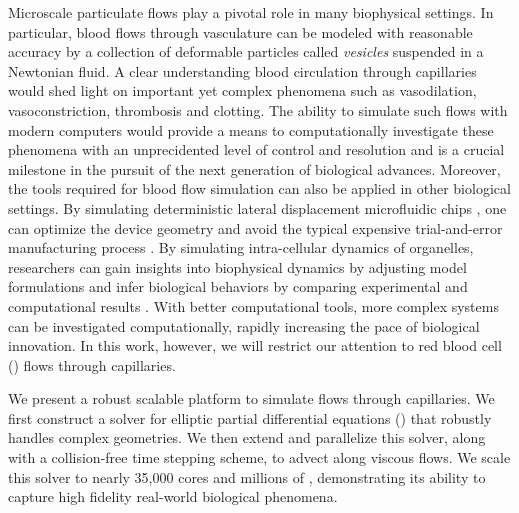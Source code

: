
Microscale particulate flows play a pivotal role in many biophysical settings.
In particular, blood flows through vasculature can be modeled with reasonable accuracy by a collection of deformable particles called \textit{vesicles} suspended in a Newtonian fluid.
A clear understanding blood circulation through capillaries would shed light on important yet complex phenomena such as vasodilation, vasoconstriction, thrombosis and clotting.
The ability to simulate such flows with modern computers would provide a means to computationally investigate these phenomena with an unprecidented level of control and resolution and is a crucial milestone in the pursuit of the next generation of biological advances.
Moreover, the tools required for blood flow simulation can also be applied in other biological settings.
By simulating deterministic lateral displacement microfluidic chips , one can optimize the device geometry and avoid the typical expensive trial-and-error manufacturing process \cite{kabacaouglu2019sorting}.
By simulating intra-cellular dynamics of organelles, researchers can gain insights into biophysical dynamics by adjusting model formulations and infer biological behaviors by comparing experimental and computational results \cite{nazockdast2017cytoplasmic}. 
With better computational tools, more complex systems can be investigated computationally, rapidly increasing the pace of biological innovation.
In this work, however, we will restrict our attention to red blood cell (\rbc) flows through capillaries.

We present a robust scalable platform to simulate \rbc flows through capillaries. 
We first construct a solver for elliptic partial differential equations (\pdes) that robustly handles complex geometries.
We then extend and parallelize this solver, along with a collision-free time stepping scheme, to advect \rbcs along viscous flows.
We scale this solver to nearly 35,000 cores and millions of \rbcs, demonstrating its ability to capture high fidelity real-world biological phenomena.

